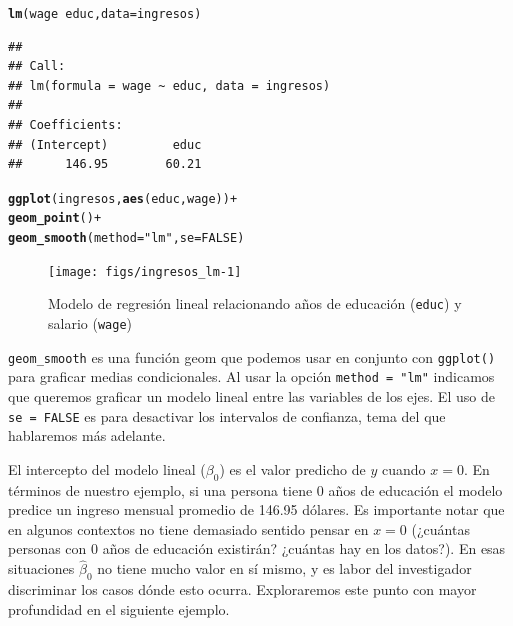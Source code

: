 \documentclass[12pt]{report}\usepackage[]{graphicx}\usepackage[]{color}
\makeatletter
\newcommand{\hlnum}[1]{\textcolor[rgb]{0.686,0.059,0.569}{#1}}%
\newcommand{\hlstr}[1]{\textcolor[rgb]{0.192,0.494,0.8}{#1}}%
\newcommand{\hlopt}[1]{\textcolor[rgb]{0,0,0}{#1}}%
\newcommand{\hlstd}[1]{\textcolor[rgb]{0.345,0.345,0.345}{#1}}%
\newcommand{\hlkwc}[1]{\textcolor[rgb]{0.333,0.667,0.333}{#1}}%
\newcommand{\hlkwd}[1]{\textcolor[rgb]{0.737,0.353,0.396}{\textbf{#1}}}%
\newenvironment{kframe}{%
 \def\at@end@of@kframe{}%
 \ifinner\ifhmode%
  \def\at@end@of@kframe{\end{minipage}}%
  \begin{minipage}{\columnwidth}%
 \fi\fi%
 \def\FrameCommand##1{\hskip\@totalleftmargin \hskip-\fboxsep
 \colorbox{shadecolor}{##1}\hskip-\fboxsep
     \hskip-\linewidth \hskip-\@totalleftmargin \hskip\columnwidth}%
 \MakeFramed {\advance\hsize-\width
   \@totalleftmargin\z@ \linewidth\hsize
   \@setminipage}}%
 {\par\unskip\endMakeFramed%
 \at@end@of@kframe}
\newenvironment{knitrout}{}{} %
\makeatother
\begin{document}
\begin{knitrout}
\color{fgcolor}\begin{kframe}
\begin{alltt}
\hlkwd{lm}\hlstd{(wage} \hlopt{~} \hlstd{educ,} \hlkwc{data} \hlstd{= ingresos)}
\end{alltt}
\begin{verbatim}
## 
## Call:
## lm(formula = wage ~ educ, data = ingresos)
## 
## Coefficients:
## (Intercept)         educ  
##      146.95        60.21
\end{verbatim}
\begin{alltt}
\hlkwd{ggplot}\hlstd{(ingresos,} \hlkwd{aes}\hlstd{(educ, wage))} \hlopt{+}
  \hlkwd{geom_point}\hlstd{()} \hlopt{+}
  \hlkwd{geom_smooth}\hlstd{(}\hlkwc{method} \hlstd{=} \hlstr{"lm"}\hlstd{,} \hlkwc{se} \hlstd{=} \hlnum{FALSE}\hlstd{)}
\end{alltt}
\end{kframe}\begin{figure}[htb]

{\centering \texttt{[image: figs/ingresos\_lm-1]} 

}

\caption[Modelo de regresión lineal relacionando años de educación (\texttt{educ}) y salario (\texttt{wage})]{Modelo de regresión lineal relacionando años de educación (\texttt{educ}) y salario (\texttt{wage})}\label{fig:ingresos_lm}
\end{figure}


\end{knitrout}
\begin{Rbox}
\verb|geom_smooth| es una función geom que podemos usar en conjunto con \verb|ggplot()| para graficar medias condicionales. Al usar la opción \verb|method = "lm"| indicamos que queremos graficar un modelo lineal entre las variables de los ejes. El uso de \verb|se = FALSE| es para desactivar los intervalos de confianza, tema del que hablaremos más adelante.
\end{Rbox}

El intercepto del modelo lineal ($\beta_0$) es el valor predicho de $y$ cuando $x=0$. En términos de nuestro ejemplo, si una persona tiene 0 años de educación el modelo predice un ingreso mensual promedio de 146.95 dólares.
Es importante notar que en algunos contextos no tiene demasiado sentido pensar en $x=0$ (¿cuántas personas con 0 años de educación existirán? ¿cuántas hay en los datos?). En esas situaciones $\hat\beta_0$ no tiene mucho valor en sí mismo, y es labor del investigador discriminar los casos dónde esto ocurra.
Exploraremos este punto con mayor profundidad en el siguiente ejemplo.
\end{document}
